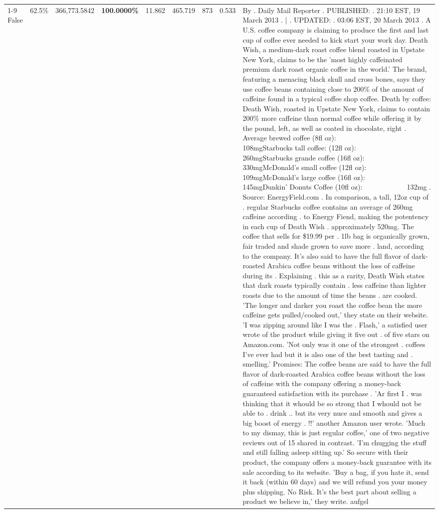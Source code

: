 \begin{table}[H]
{\begin{tabular}{lllrlllll}
\cline{1-9}
False & 62.5\% & 366,773.5842 & \bfseries \color{red} 100.0000\% & 11.862 & 465.719 & 873 & 0.533 & By . Daily Mail Reporter . PUBLISHED: . 21:10 EST, 19 March 2013 . | . UPDATED: . 03:06 EST, 20 March 2013 . A U.S. coffee company is claiming to produce the first and last cup of coffee ever needed to kick start your work day. Death Wish, a medium-dark roast coffee blend roasted in Upstate New York, claims to be the 'most highly caffeinated premium dark roast organic coffee in the world.' The brand, featuring a menacing black skull and cross bones, says they use coffee beans containing close to 200\% of the amount of caffeine found in a typical coffee shop coffee. Death by coffee: Death Wish, roasted in Upstate New York, claims to contain 200\% more caffeine than normal coffee while offering it by the pound, left, as well as coated in chocolate, right . Average brewed coffee (8fl oz):              108mgStarbucks tall coffee: (12fl oz):                260mgStarbucks grande coffee (16fl oz):         330mgMcDonald's small coffee (12fl oz):           109mgMcDonald's large coffee (16fl oz):           145mgDunkin' Donuts Coffee (10fl oz):             132mg . Source: EnergyField.com . In comparison, a tall, 12oz cup of . regular Starbucks coffee contains an average of 260mg caffeine according . to Energy Fiend, making the potentency in each cup of Death Wish . approximately 520mg. The coffee that sells for \$19.99 per . 1lb bag is organically grown, fair traded and shade grown to save more . land, according to the company. It's also said to have the full flavor of dark-roasted Arabica coffee beans without the loss of caffeine during its . Explaining . this as a rarity, Death Wish states that dark roasts typically contain . less caffeine than lighter roasts due to the amount of time the beans . are cooked. 'The longer and darker you roast the coffee bean the more caffeine gets pulled/cooked out,' they state on their website. 'I was zipping around like I was the . Flash,' a satisfied user wrote of the product while giving it five out . of five stars on Amazon.com. 'Not only was it one of the strongest . coffees I've ever had but it is also one of the best tasting and . smelling.’ Promises: The coffee beans are said to have the full flavor of dark-roasted Arabica coffee beans without the loss of caffeine with the company offering a money-back guaranteed satisfaction with its purchase . 'Ar first I . was thinking that it whould be so strong that I whould not be able to . drink .. but its very nuce and smooth and gives a big boost of energy . !!' another Amazon user wrote. 'Much to my dismay, this is just regular coffee,' one of two negative reviews out of 15 shared in contrast. 'I'm chugging the stuff and still falling asleep sitting up.' So secure with their product, the company offers a money-back guarantee with its sale according to its website. 'Buy a bag, if you hate it, send it back (within 60 days) and we will refund you your money plus shipping. No Risk. It’s the best part about selling a product we believe in,' they write. aufgel \\

\end{tabular}}
\end{table}
